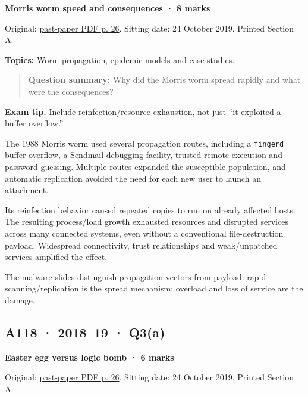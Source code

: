 \documentclass[11pt,a4paper]{article}
\begin{document}
\textbf{Morris worm speed and consequences · 8 marks}


Original: \href{../../CSE405-Security_Merged.pdf\#page=26}{past-paper PDF p. 26}. Sitting date: 24 October 2019. Printed Section A.


\textbf{Topics:} Worm propagation,\allowbreak{} epidemic models and case studies.



\begin{quote}\small

\textbf{Question summary:} Why did the Morris worm spread rapidly and what were the consequences?



\end{quote}


{\color{ForestGreen}\textbf{Exam tip.} Include reinfection/\allowbreak{}resource exhaustion,\allowbreak{} not just “it exploited a buffer overflow.”}


The 1988 Morris worm used several propagation routes,\allowbreak{} including a \texttt{fingerd} buffer overflow,\allowbreak{} a Sendmail debugging facility,\allowbreak{} trusted remote execution and password guessing. Multiple routes expanded the susceptible population,\allowbreak{} and automatic replication avoided the need for each new user to launch an attachment.


Its reinfection behavior caused repeated copies to run on already affected hosts. The resulting process/\allowbreak{}load growth exhausted resources and disrupted services across many connected systems,\allowbreak{} even without a conventional file-destruction payload. Widespread connectivity,\allowbreak{} trust relationships and weak/\allowbreak{}unpatched services amplified the effect.


The malware slides distinguish propagation vectors from payload: rapid scanning/\allowbreak{}replication is the spread mechanism; overload and loss of service are the damage.




\clearpage
\subsection{A118 · 2018–19 · Q3(a)}\label{a118}

\textbf{Easter egg versus logic bomb · 6 marks}


Original: \href{../../CSE405-Security_Merged.pdf\#page=26}{past-paper PDF p. 26}. Sitting date: 24 October 2019. Printed Section A.
\end{document}
